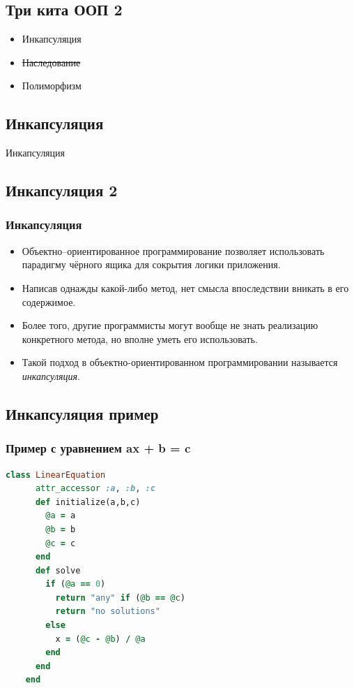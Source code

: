 \documentclass[compress,red]{beamer}
\begin{document}
\subsection{Три кита ООП 2}
\begin{frame}
  \begin{center}
    \begin{itemize}
      \item \Huge{Инкапсуляция}
      \item \Huge{\sout{Наследование}}
      \item \Huge{Полиморфизм}
    \end{itemize}
  \end{center}
\end{frame}

\subsection{Инкапсуляция}
\begin{frame}
  \begin{center}
    \Huge{Инкапсуляция}
  \end{center}
\end{frame}

\subsection{Инкапсуляция 2}
\begin{frame}[fragile]
  \frametitle{Инкапсуляция}
  \begin{itemize}
    \item Объектно--ориентированное программирование позволяет использовать парадигму чёрного ящика для сокрытия логики приложения.
    \item Написав однажды какой-либо метод, нет смысла впоследствии вникать в его содержимое.
    \item Более того, другие программисты могут вообще не знать реализацию конкретного метода, но вполне уметь его использовать.
    \item Такой подход в объектно-ориентированном программировании называется \emph{инкапсуляция}.
  \end{itemize}
\end{frame}


\subsection{Инкапсуляция пример}
\begin{frame}[fragile]
  \frametitle{Пример с уравнением ax + b = c}
  \scriptsize{
  \begin{lstlisting}[language=ruby,basicstyle=\footnotesize,label=ruby4,caption=Инкапсуляция]
    class LinearEquation
      attr_accessor :a, :b, :c
      def initialize(a,b,c)
        @a = a
        @b = b
        @c = c
      end
      def solve
        if (@a == 0)
          return "any" if (@b == @c)
          return "no solutions"
        else
          x = (@c - @b) / @a
        end
      end
    end
  \end{lstlisting}
  }
\end{frame}
\end{document}
